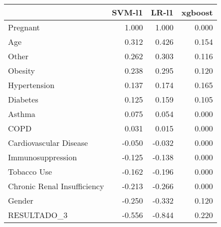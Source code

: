 \begin{tabular}{lrrr}
\toprule
{} &  SVM-l1 &  LR-l1 &  xgboost \\
\midrule
Pregnant                    &   1.000 &  1.000 &    0.000 \\
Age                         &   0.312 &  0.426 &    0.154 \\
Other                       &   0.262 &  0.303 &    0.116 \\
Obesity                     &   0.238 &  0.295 &    0.120 \\
Hypertension                &   0.137 &  0.174 &    0.165 \\
Diabetes                    &   0.125 &  0.159 &    0.105 \\
Asthma                      &   0.075 &  0.054 &    0.000 \\
COPD                        &   0.031 &  0.015 &    0.000 \\
Cardiovascular Disease      &  -0.050 & -0.032 &    0.000 \\
Immunosuppression           &  -0.125 & -0.138 &    0.000 \\
Tobacco Use                 &  -0.162 & -0.196 &    0.000 \\
Chronic Renal Insufficiency &  -0.213 & -0.266 &    0.000 \\
Gender                      &  -0.250 & -0.332 &    0.120 \\
RESULTADO\_3                 &  -0.556 & -0.844 &    0.220 \\
\bottomrule
\end{tabular}
